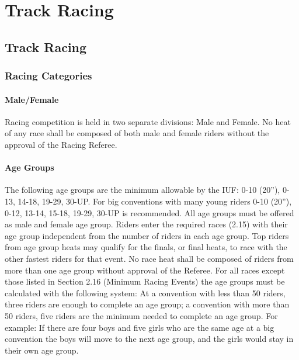 \part{Track Racing}
\parttoc

\chapter{Track Racing}

\section{Racing Categories}

\subsection{Male/Female}
Racing competition is held in two separate divisions: Male and Female. No heat of any race shall
 be composed of both male and female riders without the approval of the Racing Referee.

\subsection{Age Groups}
The following age groups are the minimum allowable by the IUF: 0-10 (20”), 0-13, 14-18, 19-29, 30-UP. For big 
conventions with many young riders 0-10 (20”), 0-12, 13-14, 15-18, 19-29, 30-UP is recommended. All age groups 
must be offered as male and female age group. Riders enter the required races (2.15) with their age group independent 
from the number of riders in each age group. Top riders from age group heats may qualify for the finals, or final heats, 
to race with the other fastest riders for that event. No race heat shall be composed of riders from more than one age 
group without approval of the Referee.
For all races except those listed in Section 2.16 (Minimum Racing Events) the age groups must be calculated with the 
following system: At a convention with less than 50 riders, three riders are enough to complete an age group; a 
convention with more than 50 riders, five riders are the minimum needed to complete an age group. For example: If 
there are four boys and five girls who are the same age at a big convention the boys will move to the next age group, 
and the girls would stay in their own age group. 